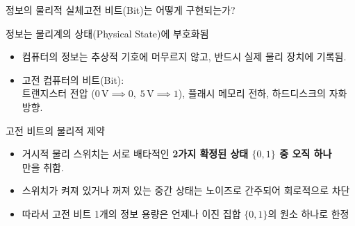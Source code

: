 \documentclass[aspectratio=169, 10pt]{beamer}
\begin{document}
\begin{frame}{정보의 물리적 실체}{고전 비트(Bit)는 어떻게 구현되는가?}
    \pause
    \begin{block}{정보는 물리계의 상태(Physical State)에 부호화됨}
        \begin{itemize}
            \item 컴퓨터의 정보는 추상적 기호에 머무르지 않고, 반드시 실제 물리 장치에 기록됨.\pause
            \item 고전 컴퓨터의 비트(Bit): \\ 트랜지스터 전압 ($0\,\mathrm{V} \implies 0, \; 5\,\mathrm{V} \implies 1$), 플래시 메모리 전하, 하드디스크의 자화 방향.
        \end{itemize}
    \end{block}
    \pause
    \vspace{0.2cm}
    \begin{alertblock}{고전 비트의 물리적 제약}
        \begin{itemize}
            \item 거시적 물리 스위치는 서로 배타적인 \textbf{2가지 확정된 상태 $\{0, 1\}$ 중 오직 하나}\\ 만을 취함.\pause
            \item 스위치가 켜져 있거나 꺼져 있는 중간 상태는 노이즈로 간주되어 회로적으로 차단\pause
            \item 따라서 고전 비트 1개의 정보 용량은 언제나 이진 집합 $\{0, 1\}$의 원소 하나로 한정
        \end{itemize}
    \end{alertblock}
\end{frame}
\end{document}
